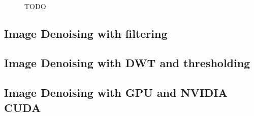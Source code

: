 \begin{figure}[t]
{	}	
			\\
\caption{TODO}
\label{fig:}
\end{figure}

\subsection{Image Denoising with filtering}
\subsection{Image Denoising with DWT and thresholding}
\subsection{Image Denoising with GPU and NVIDIA CUDA}